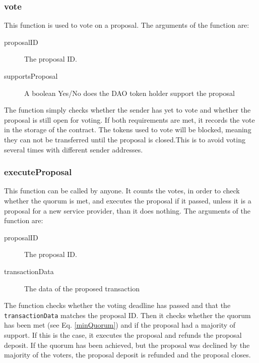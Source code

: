\documentclass[9pt,oneside]{amsart}
\begin{document}
\begin{multicols}{2}
\subsubsection*{vote}
This function is used to vote on a proposal. The arguments of the function are:
\begin{description}
 \item[proposalID] The proposal ID.
 \item[supportsProposal]  A boolean Yes/No does the DAO token holder support the proposal
\end{description}
The function simply checks whether the sender has yet to vote and whether the proposal is still open for voting. If both requirements are met, it records the vote in the storage of the contract. The tokens used to vote will be blocked, meaning they can not be transferred until the proposal is closed.This is to avoid voting several times with different sender addresses.

\subsubsection*{executeProposal}
This function can be called by anyone. It counts the votes, in order to check whether the quorum is met, and executes the proposal if it passed, unless it is a proposal for a new service provider, than it does nothing.
The arguments of the function are:
\begin{description}
 \item[proposalID] The proposal ID.
 \item[transactionData] The data of the proposed transaction
\end{description}
The function checks whether the voting deadline has passed and that the \verb|transactionData| matches the proposal ID. Then it checks whether the quorum has been met (see Eq. \ref{minQuorum}) and if the proposal had a majority of support. If this is the case, it executes the proposal and refunds the 
proposal deposit. If the quorum has been achieved, but the proposal was declined by the majority of the voters, the proposal deposit is refunded and the proposal closes.


\end{multicols}
\end{document}
